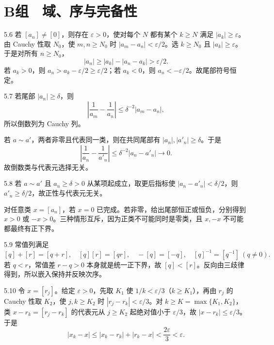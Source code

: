 \section*{B组　域、序与完备性}

\begin{solution}{5.6}
若 \([a_n]\ne[0]\)，则存在 \(\varepsilon>0\)，使对每个 \(N\) 都有某个 \(k\ge N\) 满足 \(|a_k|\ge\varepsilon\)。由 Cauchy 性取 \(N_0\)，使 \(m,n\ge N_0\) 时 \(|a_m-a_n|<\varepsilon/2\)。选 \(k\ge N_0\) 且 \(|a_k|\ge\varepsilon\)。于是对所有 \(n\ge N_0\)，
\[
 |a_n|\ge|a_k|-|a_n-a_k|>\varepsilon/2.
\]
若 \(a_k>0\)，则 \(a_n>a_k-\varepsilon/2\ge\varepsilon/2\)；若 \(a_k<0\)，则 \(a_n<-\varepsilon/2\)。故尾部符号恒定。
\end{solution}

\begin{solution}{5.7}
若尾部 \(|a_n|\ge\delta\)，则
\[
 \left|\frac1{a_m}-\frac1{a_n}\right|
 \le\delta^{-2}|a_m-a_n|,
\]
所以倒数列为 Cauchy 列。

若 \(a\sim a'\)，两者非零且代表同一类，则在共同尾部有 \(|a_n|,|a'_n|\ge\delta\)。于是
\[
 \left|\frac1{a_n}-\frac1{a'_n}\right|
 \le\delta^{-2}|a_n-a'_n|\longrightarrow0.
\]
故倒数类与代表元选择无关。
\end{solution}

\begin{solution}{5.8}
若 \(a\sim a'\) 且 \(a_n\ge\delta>0\) 从某项起成立，取更后指标使 \(|a_n-a'_n|<\delta/2\)，则 \(a'_n\ge\delta/2\)，故正性与代表元无关。

对任意类 \(x=[a_n]\)，若 \(x=0\) 已完成。若非零，给出尾部恒正或恒负，分别得到 \(x>0\) 或 \(-x>0\)。三种情形互斥，因为正类不可能同时是零类，且 \(x,-x\) 不可能都最终有正下界。
\end{solution}

\begin{solution}{5.9}
常值列满足
\[
 [q]+[r]=[q+r],\quad [q][r]=[qr],\quad
 -[q]=[-q],\quad [q]^{-1}=[q^{-1}]\ (q\ne0).
\]
若 \(q<r\)，常值差 \(r-q>0\) 本身就是统一正下界，故 \([q]<[r]\)。反向由三歧律得到，所以嵌入保持并反映次序。
\end{solution}

\begin{solution}{5.10}
令 \(x=[r_j]\)。给定 \(\varepsilon>0\)，先取 \(K_1\) 使 \(1/k<\varepsilon/3\)（\(k\ge K_1\)），再由 \(r_j\) 的 Cauchy 性取 \(K_2\)，使 \(j,k\ge K_2\) 时 \(|r_j-r_k|<\varepsilon/3\)。对 \(k\ge K=\max\{K_1,K_2\}\)，类 \(x-r_k=[r_j-r_k]\) 的代表元从 \(j\ge K_2\) 起绝对值小于 \(\varepsilon/3\)，故 \(|x-r_k|\le\varepsilon/3\)。于是
\[
 |x_k-x|\le|x_k-r_k|+|r_k-x|<\frac{2\varepsilon}{3}<\varepsilon.
\]
\end{solution}

